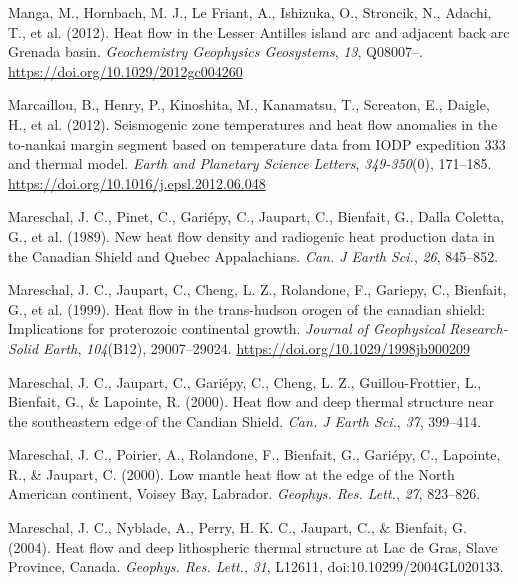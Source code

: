\documentclass[draft,linenumbers]{agujournal2018}
\begin{document}
\leavevmode{}%
Manga, M., Hornbach, M. J., Le Friant, A., Ishizuka, O., Stroncik, N.,
Adachi, T., et al. (2012). {Heat flow in the Lesser Antilles island arc
and adjacent back arc Grenada basin}. \emph{Geochemistry Geophysics
Geosystems}, \emph{13}, Q08007--.
\url{https://doi.org/10.1029/2012gc004260}

\leavevmode{}%
Marcaillou, B., Henry, P., Kinoshita, M., Kanamatsu, T., Screaton, E.,
Daigle, H., et al. (2012). Seismogenic zone temperatures and heat flow
anomalies in the to-nankai margin segment based on temperature data from
IODP expedition 333 and thermal model. \emph{Earth and Planetary Science
Letters}, \emph{349-350}(0), 171--185.
\url{https://doi.org/10.1016/j.epsl.2012.06.048}

\leavevmode{}%
Mareschal, J. C., Pinet, C., Gariépy, C., Jaupart, C., Bienfait, G.,
Dalla Coletta, G., et al. (1989). New heat flow density and radiogenic
heat production data in the {Canadian Shield} and {Quebec Appalachians}.
\emph{Can. J Earth Sci.}, \emph{26}, 845--852.

\leavevmode{}%
Mareschal, J. C., Jaupart, C., Cheng, L. Z., Rolandone, F., Gariepy, C.,
Bienfait, G., et al. (1999). Heat flow in the trans-hudson orogen of the
canadian shield: Implications for proterozoic continental growth.
\emph{Journal of Geophysical Research-Solid Earth}, \emph{104}(B12),
29007--29024. \url{https://doi.org/10.1029/1998jb900209}

\leavevmode{}%
Mareschal, J. C., Jaupart, C., Gariépy, C., Cheng, L. Z.,
Guillou-Frottier, L., Bienfait, G., \& Lapointe, R. (2000). Heat flow
and deep thermal structure near the southeastern edge of the {Candian
Shield}. \emph{Can. J Earth Sci.}, \emph{37}, 399--414.

\leavevmode{}%
Mareschal, J. C., Poirier, A., Rolandone, F., Bienfait, G., Gariépy, C.,
Lapointe, R., \& Jaupart, C. (2000). Low mantle heat flow at the edge of
the {North American} continent, {Voisey Bay, Labrador}. \emph{Geophys.
Res. Lett.}, \emph{27}, 823--826.

\leavevmode{}%
Mareschal, J. C., Nyblade, A., Perry, H. K. C., Jaupart, C., \&
Bienfait, G. (2004). Heat flow and deep lithospheric thermal structure
at {Lac de Gras, Slave Province, Canada}. \emph{Geophys. Res. Lett.},
\emph{31}, L12611, doi:10.10299/2004GL020133.
\end{document}
